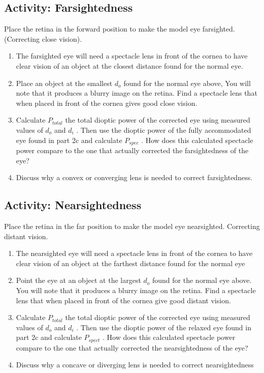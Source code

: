 \subsection{Activity: Farsightedness}
Place the retina in the forward position to make the model eye farsighted.(Correcting close vision).
\begin{enumerate}
	 \item The farsighted eye will need a spectacle lens in front of the cornea to have clear vision of an object at the closest distance found for the normal eye.
	\item Place an object at the smallest $d_o$ found for the normal eye above, You will note that it produces a blurry image on the retina. Find a spectacle lens that when placed in front of the cornea gives good close vision.
	\item Calculate $P_{total}$ the total dioptic power of the corrected eye using measured values of $d_o$ and $d_i$ . Then use the dioptic power of the fully accommodated eye found in part 2c and calculate $P_{spec}$ . How does this calculated spectacle power compare to the one that actually corrected the farsightedness of the eye?
	\item Discuss why a convex or converging lens is needed to correct farsightedness.
\end{enumerate}

\subsection{Activity: Nearsightedness}
Place the retina in the far position to make the model eye nearsighted. Correcting distant vision.
\begin{enumerate}
	\item The nearsighted eye will need a spectacle lens in front of the cornea to have clear vision of an object at the farthest distance found for the normal eye
	\item Point the eye at an object at the largest $d_o$ found for the normal eye above. You will note that it produces a blurry image on the retina. Find a spectacle lens that when placed in front of the cornea give good distant vision.
	\item Calculate $P_{total}$ the total dioptic power of the corrected eye using measured values of $d_o$ and $d_i$ . Then use the dioptic power of the relaxed eye found in part 2c and calculate $P_{spect}$ . How does this calculated spectacle power compare to the one that actually corrected the nearsightedness of the eye?
	\item Discuss why a concave or diverging lens is needed to correct nearsightedness
\end{enumerate}

